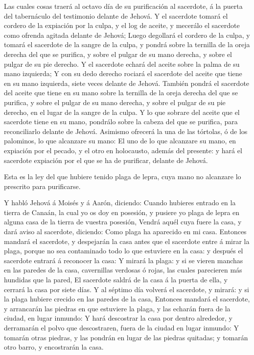  Las cuales cosas traerá al octavo día de su purificación
al sacerdote, á la puerta del tabernáculo del testimonio delante de
Jehová.  Y el sacerdote tomará el cordero de la expiación
por la culpa, y el log de aceite, y mecerálo el sacerdote como ofrenda
agitada delante de Jehová;  Luego degollará el cordero de
la culpa, y tomará el sacerdote de la sangre de la culpa, y pondrá sobre
la ternilla de la oreja derecha del que se purifica, y sobre el pulgar
de su mano derecha, y sobre el pulgar de su pie derecho.  Y
el sacerdote echará del aceite sobre la palma de su mano izquierda;
 Y con su dedo derecho rociará el sacerdote del aceite que
tiene en su mano izquierda, siete veces delante de Jehová. 
También pondrá el sacerdote del aceite que tiene en su mano sobre la
ternilla de la oreja derecha del que se purifica, y sobre el pulgar de
su mano derecha, y sobre el pulgar de su pie derecho, en el lugar de la
sangre de la culpa.  Y lo que sobrare del aceite que el
sacerdote tiene en su mano, pondrálo sobre la cabeza del que se
purifica, para reconciliarlo delante de Jehová.  Asimismo
ofrecerá la una de las tórtolas, ó de los palominos, lo que alcanzare su
mano:  El uno de lo que alcanzare su mano, en expiación por
el pecado, y el otro en holocausto, además del presente: y hará el
sacerdote expiación por el que se ha de purificar, delante de Jehová.

 Esta es la ley del que hubiere tenido plaga de lepra, cuya
mano no alcanzare lo prescrito para purificarse.

 Y habló Jehová á Moisés y á Aarón, diciendo: 
Cuando hubieres entrado en la tierra de Canaán, la cual yo os doy en
posesión, y pusiere yo plaga de lepra en alguna casa de la tierra de
vuestra posesión,  Vendrá aquél cuya fuere la casa, y dará
aviso al sacerdote, diciendo: Como plaga ha aparecido en mi casa.
 Entonces mandará el sacerdote, y despejarán la casa antes
que el sacerdote entre á mirar la plaga, porque no sea contaminado todo
lo que estuviere en la casa: y después el sacerdote entrará á reconocer
la casa:  Y mirará la plaga: y si se vieren manchas en las
paredes de la casa, cavernillas verdosas ó rojas, las cuales parecieren
más hundidas que la pared,  El sacerdote saldrá de la casa
á la puerta de ella, y cerrará la casa por siete días.  Y
al séptimo día volverá el sacerdote, y mirará: y si la plaga hubiere
crecido en las paredes de la casa,  Entonces mandará el
sacerdote, y arrancarán las piedras en que estuviere la plaga, y las
echarán fuera de la ciudad, en lugar inmundo:  Y hará
descostrar la casa por dentro alrededor, y derramarán el polvo que
descostraren, fuera de la ciudad en lugar inmundo:  Y
tomarán otras piedras, y las pondrán en lugar de las piedras quitadas; y
tomarán otro barro, y encostrarán la casa.

